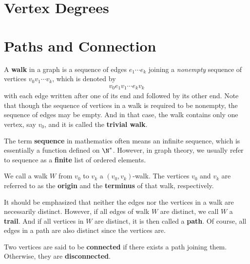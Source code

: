 \documentclass[thmcnt=section, 12pt, color=cyan]{my-elegantbook}
\begin{document}

\section{Vertex Degrees}







\section{Paths and Connection}


A \textbf{walk} in a graph is a sequence of edges $e_1 \cdots e_k$ joining a \textit{nonempty} sequence of vertices $v_0 v_1 \cdots v_k$, which is denoted by 
\begin{align}
    v_0 e_1 v_1 \cdots e_k v_k 
    \label{eq:3}
\end{align}
with each edge written after one of its end and followed by its other end. Note that though the sequence of vertices in a walk is required to be nonempty, the sequence of edges may be empty. And in that case, the walk contains only one vertex, say $v_0$, and it is called the \textbf{trivial walk}.
\begin{note}
    The term \textbf{sequence} in mathematics often means an infinite sequence, which is essentially a function defined on $\N^\ast$. However, in graph theory, we usually refer to sequence as a \textbf{finite} list of ordered elements.
\end{note}

We call a walk $W$ from $v_0$ to $v_k$ a $(v_0, v_k)$-walk. The vertices $v_0$ and $v_k$ are referred to as the \textbf{origin} and the \textbf{terminus} of that walk, respectively. 

It should be emphasized that neither the edges nor the vertices in a walk are necessarily distinct. However, if all edges of walk $W$ are distinct, we call $W$ a \textbf{trail}. And if all vertices in $W$ are distinct, it is then called a \textbf{path}. Of course, all edges in a path are also distinct since the vertices are.

Two vertices are said to be \textbf{connected} if there exists a path joining them. Otherwise, they are \textbf{disconnected}. 
\end{document}
